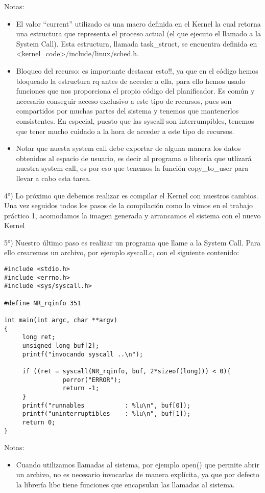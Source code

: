 Notas:
\begin{itemize}  
\item El valor “current” utilizado es una macro definida en el Kernel la cual retorna una estructura que representa el proceso actual (el que ejecuto el llamado a la System Call). Esta estructura, llamada task\_struct, se encuentra definida en <kernel\_code>/include/linux/sched.h.
\item Bloqueo del recurso: es importante destacar esto!!, ya que en el código hemos bloqueado la estructura rq antes de acceder a ella, para ello hemos usado funciones que nos proporciona el propio código del planificador. Es común y necesario conseguir acceso exclusivo a este tipo de recursos, pues son compartidos por muchas partes del sistema y tenemos que mantenerlos consistentes. En especial, puesto que las syscall son interrumpibles, tenemos que tener mucho cuidado a la hora de acceder a este tipo de recursos.
\item Notar que nuesta system call debe exportar de alguna manera los datos obtenidos al espacio de usuario, es decir al programa o librería que utlizará nuestra system call, es por eso que tenemos la función copy\_to\_user para llevar a cabo esta tarea.
\end{itemize}  

4°) Lo próximo que debemos realizar es compilar el Kernel con nuestros cambios. Una vez seguidos todos los pasos de la compilación como lo vimos en el trabajo práctico 1, acomodamos la imagen generada y arrancamos el sistema con el nuevo Kernel

5°) Nuestro último paso es realizar un programa que llame a la System Call. Para ello crearemos un archivo, por ejemplo syscall.c, con el siguiente contenido:

\begin{verbatim}
#include <stdio.h>
#include <errno.h>
#include <sys/syscall.h>

#define NR_rqinfo 351

int main(int argc, char **argv)
{
     long ret;
     unsigned long buf[2];
     printf("invocando syscall ..\n");

     if ((ret = syscall(NR_rqinfo, buf, 2*sizeof(long))) < 0){
                perror("ERROR");
                return -1;
     }
     printf("runnables           : %lu\n", buf[0]);
     printf("uninterruptibles    : %lu\n", buf[1]);
     return 0;
}
\end{verbatim}


Notas:
\begin{itemize}  
\item Cuando utilizamos llamadas al sistema, por ejemplo open() que permite abrir un archivo, no es necesario invocarlas de manera explícita, ya que por defecto la librería libc tiene funciones que encapsulan las llamadas al sistema. 
\end{itemize}  

